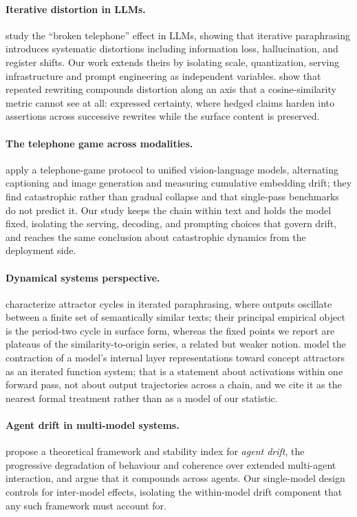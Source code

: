 \documentclass[11pt]{article}
\begin{document}
\paragraph{Iterative distortion in LLMs.}
\citet{mohamed2025broken} study the ``broken telephone'' effect in LLMs, showing
that iterative paraphrasing introduces systematic distortions including information
loss, hallucination, and register shifts. Our work extends theirs by isolating
scale, quantization, serving infrastructure and prompt engineering as independent
variables. \citet{belem2026certainty} show that repeated rewriting compounds
distortion along an axis that a cosine-similarity metric cannot see at all:
expressed certainty, where hedged claims harden into assertions across successive
rewrites while the surface content is preserved.

\paragraph{The telephone game across modalities.}
\citet{mollah2025telephone} apply a telephone-game protocol to unified
vision-language models, alternating captioning and image generation and measuring
cumulative embedding drift; they find catastrophic rather than gradual collapse
and that single-pass benchmarks do not predict it. Our study keeps the chain
within text and holds the model fixed, isolating the serving, decoding, and
prompting choices that govern drift, and reaches the same conclusion about
catastrophic dynamics from the deployment side.

\paragraph{Dynamical systems perspective.}
\citet{wang2025attractor} characterize attractor cycles in iterated paraphrasing,
where outputs oscillate between a finite set of semantically similar texts;
their principal empirical object is the period-two cycle in surface form, whereas
the fixed points we report are plateaus of the similarity-to-origin series, a
related but weaker notion. \citet{chytas2025concept} model the contraction of a
model's internal layer representations toward concept attractors as an iterated
function system; that is a statement about activations within one forward pass,
not about output trajectories across a chain, and we cite it as the nearest
formal treatment rather than as a model of our statistic.

\paragraph{Agent drift in multi-model systems.}
\citet{rath2026agent} propose a theoretical framework and stability index for
\emph{agent drift}, the progressive degradation of behaviour and coherence over
extended multi-agent interaction, and argue that it compounds across agents. Our
single-model design controls for inter-model effects, isolating the within-model
drift component that any such framework must account for.
\end{document}
